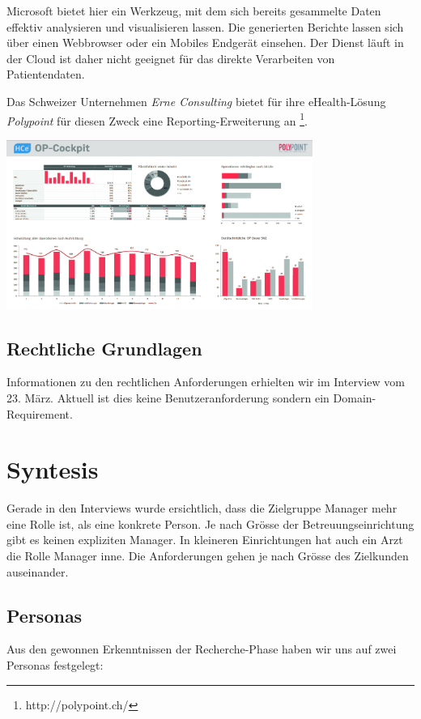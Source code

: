 \documentclass[a4paper]{scrreprt}
\begin{document}
Microsoft bietet hier ein Werkzeug, mit dem sich bereits gesammelte Daten effektiv analysieren und visualisieren lassen. Die generierten Berichte lassen sich über einen Webbrowser oder ein Mobiles Endgerät einsehen. Der Dienst läuft in der Cloud ist daher nicht geeignet für das direkte Verarbeiten von Patientendaten.

\bigskip

Das Schweizer Unternehmen \textit{Erne Consulting} bietet für ihre eHealth-Lösung \textit{Polypoint} für diesen Zweck eine Reporting-Erweiterung an \footnote{http://polypoint.ch/}.

\includegraphics[width=0.75\textwidth]{img/research_polypoint_op-cockpit.jpg}



\subsection{Rechtliche Grundlagen}
Informationen zu den rechtlichen Anforderungen erhielten wir im Interview vom 23. März. Aktuell ist dies keine Benutzeranforderung sondern ein Domain-Requirement.



\section{Syntesis}
Gerade in den Interviews wurde ersichtlich, dass die Zielgruppe Manager mehr eine Rolle ist, als eine konkrete Person. Je nach Grösse der Betreuungseinrichtung gibt es keinen expliziten Manager. In kleineren Einrichtungen hat auch ein Arzt die Rolle Manager inne.
Die Anforderungen gehen je nach Grösse des Zielkunden auseinander.

\subsection{Personas}
Aus den gewonnen Erkenntnissen der Recherche-Phase haben wir uns auf zwei Personas festgelegt:
\end{document}
